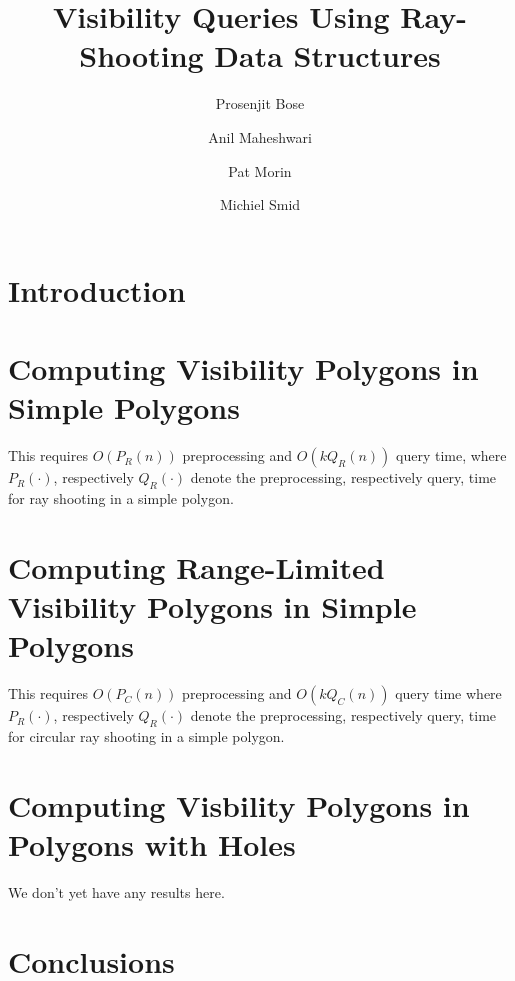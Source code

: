 \documentclass[lotsofwhite,charterfonts]{patmorin}
\title{Visibility Queries Using Ray-Shooting Data Structures}
\author{Prosenjit Bose \and
	Anil Maheshwari \and
	Pat Morin \and
	Michiel Smid}
\begin{document}
\maketitle

\section{Introduction}

\section{Computing Visibility Polygons in Simple Polygons}

This requires $O(P_R(n))$ preprocessing and $O(kQ_R(n))$ query time,
where $P_R(\cdot)$, respectively $Q_R(\cdot)$ denote the
preprocessing, respectively query, time for ray shooting in a simple
polygon.

\section{Computing Range-Limited Visibility Polygons in Simple
	Polygons}

This requires $O(P_C(n))$ preprocessing and $O(kQ_C(n))$ query time
where $P_R(\cdot)$, respectively $Q_R(\cdot)$ denote the
preprocessing, respectively query, time for circular ray shooting in a
simple polygon.

\section{Computing Visbility Polygons in Polygons with Holes}

We don't yet have any results here.

\section{Conclusions}
\end{document}
